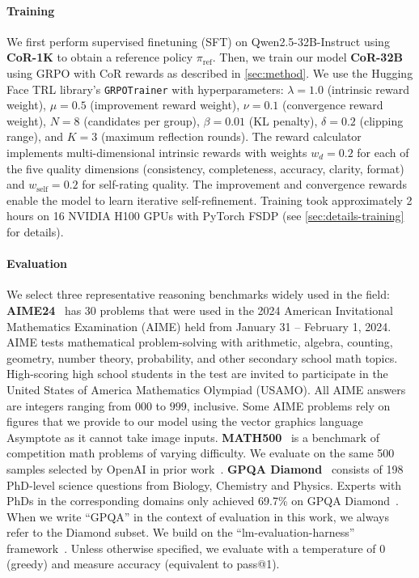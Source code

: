 \documentclass{article}
\theoremstyle{plain}
\theoremstyle{definition}
\theoremstyle{remark}
\newcommand{\data}{\textbf{CoR-1K}}
\newcommand{\model}{\textbf{CoR-32B}}
\begin{document}
\paragraph{Training} We first perform supervised finetuning (SFT) on Qwen2.5-32B-Instruct using \data{} to obtain a reference policy $\pi_{\text{ref}}$. Then, we train our model \model{} using GRPO with CoR rewards as described in \autoref{sec:method}. We use the Hugging Face TRL library's \texttt{GRPOTrainer} with hyperparameters: $\lambda = 1.0$ (intrinsic reward weight), $\mu = 0.5$ (improvement reward weight), $\nu = 0.1$ (convergence reward weight), $N = 8$ (candidates per group), $\beta = 0.01$ (KL penalty), $\delta = 0.2$ (clipping range), and $K = 3$ (maximum reflection rounds). The reward calculator implements multi-dimensional intrinsic rewards with weights $w_d = 0.2$ for each of the five quality dimensions (consistency, completeness, accuracy, clarity, format) and $w_{\text{self}} = 0.2$ for self-rating quality. The improvement and convergence rewards enable the model to learn iterative self-refinement. Training took approximately 2 hours on 16 NVIDIA H100 GPUs with PyTorch FSDP (see \autoref{sec:details-training} for details).

\paragraph{Evaluation} We select three representative reasoning benchmarks widely used in the field: \textbf{AIME24}~\citep{aime} has 30 problems that were used in the 2024 American Invitational Mathematics Examination (AIME) held from January 31 – February 1, 2024. AIME tests mathematical problem-solving with arithmetic, algebra, counting, geometry, number theory, probability, and other secondary school math topics. High-scoring high school students in the test are invited to participate in the United States of America Mathematics Olympiad (USAMO). All AIME answers are integers ranging from $000$ to $999$, inclusive. Some AIME problems rely on figures that we provide to our model using the vector graphics language Asymptote as it cannot take image inputs. \textbf{MATH500}~\citep{hendrycks2021measuringmathematicalproblemsolving} is a benchmark of competition math problems of varying difficulty. We evaluate on the same 500 samples selected by OpenAI in prior work~\citep{lightman2023letsverifystepstep}. \textbf{GPQA Diamond}~\citep{rein2023gpqagraduatelevelgoogleproofqa} consists of 198 PhD-level science questions from Biology, Chemistry and Physics. Experts with PhDs in the corresponding domains only achieved 69.7\% on GPQA Diamond~\citep{o1}. When we write ``GPQA'' in the context of evaluation in this work, we always refer to the Diamond subset. We build on the ``lm-evaluation-harness'' framework~\citep{eval-harness,biderman2024lessons}. Unless otherwise specified, we evaluate with a temperature of 0 (greedy) and measure accuracy (equivalent to pass@1).
\end{document}
